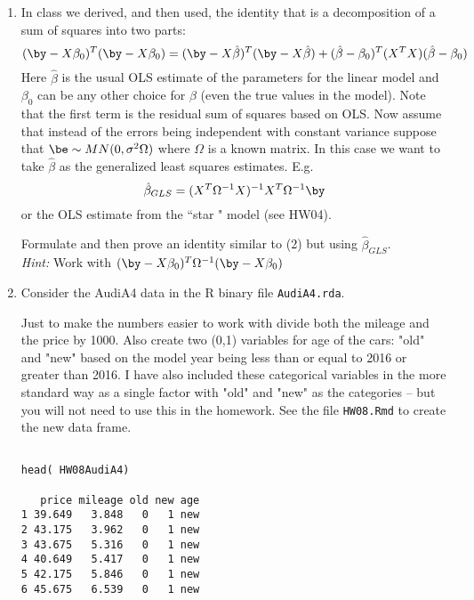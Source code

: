 \documentclass[10pt]{report}
\begin{document}
\begin{enumerate}
 
 
 
\item 
In class  we derived, and then used, the identity that is a decomposition of a sum of squares into two parts:
\begin{equation}
(\by - X\beta_0)^T (\by - X\beta_0) = (\by - X\hat{\beta})^T(\by - X\hat{\beta}) + 
(\hat{\beta} - \beta_0)^T (X^T X)(\hat{\beta} - \beta_0) 
\end{equation}
Here $\hat{\beta}$ is the usual OLS estimate of the parameters for the linear model and $\beta_0$ can be any other choice for $\beta$ (even the true values in the model). Note that the first term is the residual sum of squares based on OLS. Now assume that instead of the errors being independent with constant variance suppose that $\be \sim MN( 0,\sigma^2 \Omega)$  where $\Omega$ is a known  matrix.  In this  case we want to take $\hat{\beta}$ as the generalized least squares estimates.  E.g. 
\[ \hat{\beta}_{GLS} = ( X^T \Omega^{-1} X)^{-1} X^T \Omega^{-1} \by \]
or the OLS estimate from the ``star " model (see HW04). 

Formulate and then prove an identity similar to (2) but using  $\hat{\beta}_{GLS}$.
\\

{\it Hint:}  Work with $(\by - X\beta_0)^T \Omega^{-1} (\by - X\beta_0)$

\item 
Consider the AudiA4 data in the R binary file {\tt AudiA4.rda}.


Just to make the numbers easier to work with divide both the mileage and the price by 1000. 
Also create  two (0,1) variables for age of the cars:  "old" and "new" based on the model year being less than or equal to  2016 or greater than  2016.
I have also included these categorical variables in the more standard  way as a single factor with "old" and "new" as the categories -- but you will not need to use this in the homework. See the file {\tt HW08.Rmd} to create the new data frame. 

\begin{verbatim}

head( HW08AudiA4)
                                  
   price mileage old new age
1 39.649   3.848   0   1 new
2 43.175   3.962   0   1 new
3 43.675   5.316   0   1 new
4 40.649   5.417   0   1 new
5 42.175   5.846   0   1 new
6 45.675   6.539   0   1 new                                  
 \end{verbatim}


\end{enumerate}
\end{document}
